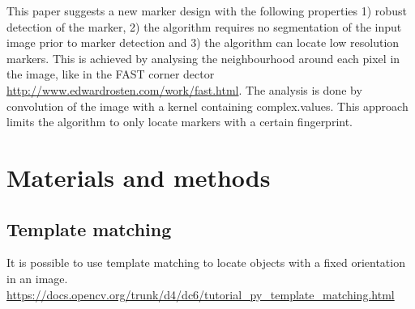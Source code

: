 \documentclass{article}
\begin{document}
This paper suggests a new marker design with the following properties 
1) robust detection of the marker, 
2) the algorithm requires no segmentation of the input image prior to marker detection and 
3) the algorithm can locate low resolution markers. 
This is achieved by analysing the neighbourhood around each pixel in the image, like in the FAST corner dector \url{http://www.edwardrosten.com/work/fast.html}. 
The analysis is done by convolution of the image with a kernel containing complex.values. 
This approach limits the algorithm to only locate markers with a certain fingerprint. 
 
\section{Materials and methods} 
\subsection{Template matching} 
It is possible to use template matching to locate objects with a fixed orientation in an image. 
\url{https://docs.opencv.org/trunk/d4/dc6/tutorial_py_template_matching.html} 
\end{document}
